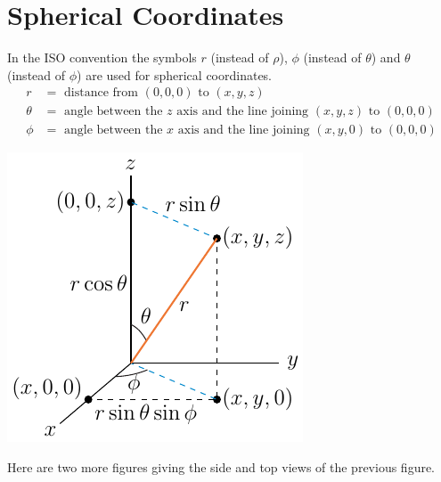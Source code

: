 \section{Spherical Coordinates}\label{ap:ISOspherCoord}

In the ISO convention the symbols $r$ (instead of $\rho$), 
$\phi$ (instead of $\theta$) and $\theta$ (instead of $\phi$) are used 
for spherical coordinates.
\begin{align*}
r&=\text{ distance from }(0,0,0)\text{ to }(x,y,z)\\
\theta&=\text{ angle between the $z$ axis and the line joining $(x,y,z)$ to $(0,0,0)$} \\
\phi&=\text{ angle between the $x$ axis and the line joining $(x,y,0)$ to $(0,0,0)$}
\end{align*}
\begin{efig}
\begin{center}
    \includegraphics{spherical.pdf}
\end{center}
\end{efig}
Here are two more figures giving the side and top views of the 
previous figure.
